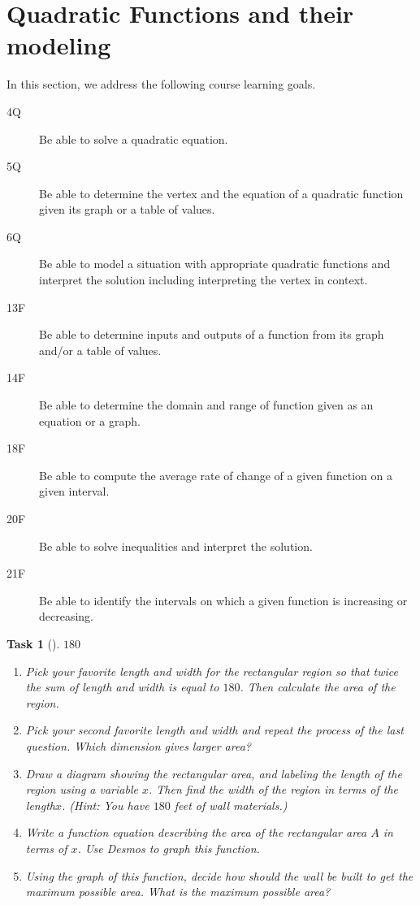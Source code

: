 \documentclass[10pt,]{article}
\theoremstyle{plain}
\newtheorem{proposition}[theorem]{Task}
\theoremstyle{definition}
\numberwithin{equation}{section}
\begin{document}
\section[{Quadratic Functions and their modeling}]{Quadratic Functions and their modeling}\label{section-3}
\hypertarget{p-39}{}%
In this section, we address the following course learning goals.%
\leavevmode%
\begin{description}
\item[{4Q}]\hypertarget{li-60}{}\hypertarget{p-40}{}%
Be able to solve a quadratic equation.%
\item[{5Q}]\hypertarget{li-61}{}\hypertarget{p-41}{}%
Be able to determine the vertex and the equation of a quadratic function given its graph or a table of values.%
\item[{6Q}]\hypertarget{li-62}{}\hypertarget{p-42}{}%
Be able to model a situation with appropriate quadratic functions and interpret the solution including interpreting the vertex in context.%
\item[{13F}]\hypertarget{li-63}{}\hypertarget{p-43}{}%
Be able to determine inputs and outputs of a function from its graph and/or a table of values.%
\item[{14F}]\hypertarget{li-64}{}\hypertarget{p-44}{}%
Be able to determine the domain and range of function given as an equation or a graph.%
\item[{18F}]\hypertarget{li-65}{}\hypertarget{p-45}{}%
Be able to compute the average rate of change of a given function on a given interval.%
\item[{20F}]\hypertarget{li-66}{}\hypertarget{p-46}{}%
Be able to solve inequalities and interpret the solution.%
\item[{21F}]\hypertarget{li-67}{}\hypertarget{p-47}{}%
Be able to identify the intervals on which a given function is increasing or decreasing.%
\end{description}
\begin{proposition}[{}]\label{motivation-quadratic}
\(180\)\leavevmode%
\begin{enumerate}
\item\hypertarget{li-68}{}Pick your favorite length and width for the rectangular region so that twice the sum of length and width is equal to \(180\). Then calculate the area of the region.%
\item\hypertarget{li-69}{}Pick your second favorite length and width and repeat the process of the last question. Which dimension gives larger area?%
\item\hypertarget{li-70}{}Draw a diagram showing the rectangular area, and labeling the length of the region using a variable \(x\). Then find the width of the region in terms of the length\(x\). (Hint: You have \(180\) feet of wall materials.)%
\item\hypertarget{li-71}{}Write a function equation describing the area of the rectangular area \(A\) in terms of \(x\). Use Desmos to graph this function.%
\item\hypertarget{li-72}{}Using the graph of this function, decide how should the wall be built to get the maximum possible area. What is the maximum possible area?%
\end{enumerate}
\end{proposition}
\end{document}
